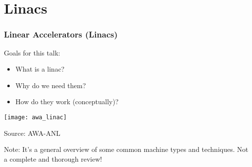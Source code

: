 \documentclass[professionalfonts,t]{beamer}
\begin{document}
\section{Linacs}

\begin{frame}
	\frametitle{Linear Accelerators (Linacs)}
	
	\vspace{1em}
	
	\begin{minipage}{0.43\textwidth}
		Goals for this talk:
		
		\begin{itemize}
			\item What is a linac?
			\item Why do we need them?
			\item How do they work (conceptually)?
		\end{itemize}
	\end{minipage}
\begin{minipage}{0.55\textwidth}
	\centering
	\texttt{[image: awa\_linac]}
	
	Source: AWA-ANL 
\end{minipage}

\vspace{1em}
Note: It's a general overview of some common machine types and techniques.
Not a complete and thorough review!

\end{frame}
\end{document}
